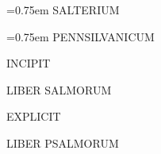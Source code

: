 \documentclass[twoside,12pt]{book}
\begin{document}
\pagestyle{empty}
\setcounter{page}{0}

\vspace*{\fill}

\begin{center}
{\extraboldfont\Huge{}\font=0.75em SALTERIUM}

\skipIV



{\extraboldfont\Huge{}\font=0.75em PENNSILVANICUM}

\skipII





\end{center}

\vfill\vfill
\newpage

\large

\pagestyle{fancy}




\setlength{\parindent}{0em}

\vspace*{\fill}

{\formatTextNoteSection\bfseries\centering

  INCIPIT

  \skipI

  LIBER SALMORUM

}

\vfill\vfill



\vfill

{\formatTextNoteSection\bfseries\centering

  EXPLICIT

  \skipI

  LIBER PSALMORUM

}

\vfill


\end{document}
